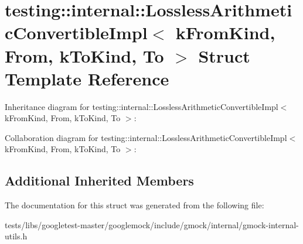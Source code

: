 \hypertarget{structtesting_1_1internal_1_1LosslessArithmeticConvertibleImpl}{}\section{testing\+:\+:internal\+:\+:Lossless\+Arithmetic\+Convertible\+Impl$<$ k\+From\+Kind, From, k\+To\+Kind, To $>$ Struct Template Reference}
\label{structtesting_1_1internal_1_1LosslessArithmeticConvertibleImpl}


Inheritance diagram for testing\+:\+:internal\+:\+:Lossless\+Arithmetic\+Convertible\+Impl$<$ k\+From\+Kind, From, k\+To\+Kind, To $>$\+:


Collaboration diagram for testing\+:\+:internal\+:\+:Lossless\+Arithmetic\+Convertible\+Impl$<$ k\+From\+Kind, From, k\+To\+Kind, To $>$\+:
\subsection*{Additional Inherited Members}


The documentation for this struct was generated from the following file\+:\begin{DoxyCompactItemize}
\item 
tests/libs/googletest-\/master/googlemock/include/gmock/internal/gmock-\/internal-\/utils.\+h\end{DoxyCompactItemize}
